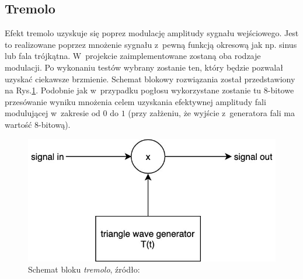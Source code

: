 \subsection{Tremolo}

Efekt tremolo uzyskuje się poprez modulację amplitudy sygnału wejściowego. Jest to realizowane poprzez mnożenie sygnału z~pewną funkcją okresową jak np. sinus lub fala trójkątna. W~projekcie zaimplementowane zostaną oba rodzaje modulacji. Po wykonaniu testów wybrany zostanie ten, który będzie pozwalał uzyskać ciekawsze brzmienie. Schemat blokowy rozwiązania został przedstawiony na Rys.\ref{effects-tremolo}. Podobnie jak w~przypadku pogłosu wykorzystane zostanie tu 8-bitowe przesówanie wyniku mnożenia celem uzyskania efektywnej amplitudy fali modulującej w~zakresie od $0$ do $1$ (przy załżeniu, że wyjście z~generatora fali ma wartość 8-bitową).

\vspace{0.5cm}
\begin{figure}[ht]
    \centering
    \includegraphics[scale=0.4]{img/tremolo.jpg}
    \captionsetup{format=plain,justification=centering}
    \caption{Schemat bloku \textit{tremolo}, źródło: \cite{fpga_pedal}}
    \label{effects-tremolo}
\end{figure}
\vspace{0.5cm}